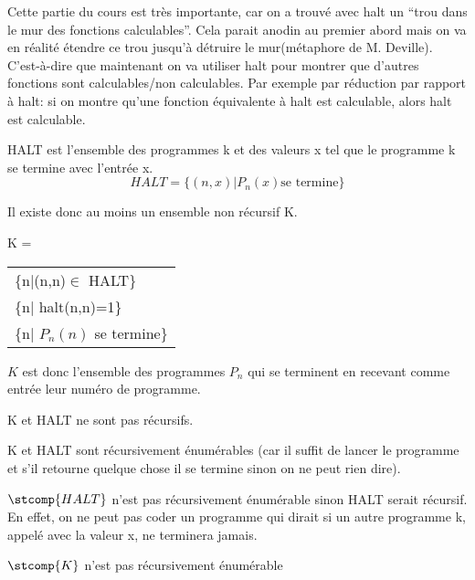 \begin{myrem}
	Cette partie du cours est très importante, car on a trouvé avec halt un ``trou dans le mur des fonctions calculables''. Cela parait anodin au premier abord mais on va en réalité étendre ce trou jusqu'à détruire le mur(métaphore
	de M. Deville). C'est-à-dire que maintenant on va utiliser halt pour montrer que d'autres fonctions sont calculables/non calculables. Par exemple	par réduction par rapport à halt: si on montre qu'une fonction équivalente à halt est calculable, alors halt est calculable.
\end{myrem}

\begin{mydef}[HALT]
	HALT est l'ensemble des programmes k et des valeurs x tel que le programme k se termine avec l'entrée x.
	\[ HALT = \{(n,x)|P_n(x)\text{se termine}\}\]
\end{mydef}

Il existe donc au moins un ensemble non récursif
K.

\begin{mydef}[K]
	K =
	\begin{tabular}{l}
		\{n|(n,n)$\in$ HALT\}\\
		\{n| halt(n,n)=1\}\\
		\{n| $P_n(n)$ se termine\}
	\end{tabular}

	$K$ est donc l'ensemble des programmes $P_n$ qui se terminent en recevant comme entrée leur numéro de programme.
\end{mydef}

\begin{myprop}
	K et HALT ne sont pas récursifs.
\end{myprop}

\begin{myprop}
	K et HALT sont récursivement énumérables (car il suffit de lancer le programme et s’il retourne quelque chose il se termine sinon on ne peut rien dire).
\end{myprop}

\begin{myprop}
	$\stcomp{HALT}$ n'est pas récursivement énumérable sinon HALT serait récursif.  En effet, on ne peut pas coder un programme qui dirait si un autre programme k, appelé avec la valeur x, ne terminera jamais.
\end{myprop}

\begin{myprop}
	$\stcomp{K}$ n'est pas récursivement énumérable
\end{myprop}

